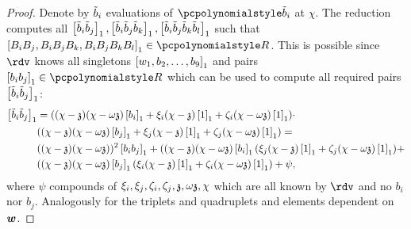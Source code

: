 \documentclass[runningheads,11pt]{llncs}
\let\spvec\vec
\let\vec\accentvec
\let\spvec\vec
\let\vec\spvec
\def\vec#1{\mathchoice{\mbox{\boldmath$\displaystyle#1$}}
  {\mbox{\boldmath$\textstyle#1$}} {\mbox{\boldmath$\scriptstyle#1$}}
  {\mbox{\boldmath$\scriptscriptstyle#1$}}}
\begin{document}
\begin{proof}
Denote by $\tilde{b}_i$ evaluations of $\p{\tb}_i$ at $\chi$.  The reduction computes
all
$\left[\tilde{b}_i \tilde{b}_j\right]_{1}, \left[\tilde{b}_i \tilde{b}_j \tilde{b}_k\right]_{1}, \left[\tilde{b}_i \tilde{b}_j \tilde{b}_k \tilde{b}_l\right]_{1}$
such that $\gone{B_i B_j, B_i B_j B_k, B_i B_j B_k B_l} \in \pR$.  This is
possible since $\rdv$ knows all singletons $\left[w_1, b_2, \ldots, b_9\right]_{1}$ and pairs
$\gone{b_i b_j} \in \pR$ which can be used to compute all required pairs
$\left[\tilde{b}_i \tilde{b}_j\right]_{1}$:
\begin{align*}
\left[\tilde{b}_i \tilde{b}_j\right]_{1} 
& = ((\chi - \mathfrak{z})(\chi - {\omega \mathfrak{z}})\left[b_i\right]_{1} + \xi_i (\chi - \mathfrak{z})\left[1\right]_{1} +
\zeta_i (\chi - {\omega \mathfrak{z}}) \left[1\right]_{1}) 
\cdot \\
 & ((\chi - \mathfrak{z})(\chi - {\omega \mathfrak{z}})\left[b_j\right]_{1} + \xi_j (\chi - \mathfrak{z})\left[1\right]_{1} +
\zeta_j (\chi - {\omega \mathfrak{z}}) \left[1\right]_{1}) = \\
 & ((\chi - \mathfrak{z})(\chi - {\omega \mathfrak{z}}))^2 \left[b_i b_j\right]_{1} +  ((\chi - \mathfrak{z})(\chi -
 {\omega \mathfrak{z}})\left[b_i\right]_{1} (\xi_j (\chi - \mathfrak{z}) \left[1\right]_{1} + \zeta_j (\chi - {\omega \mathfrak{z}})
 \left[1\right]_{1}) + \\
 & ((\chi - \mathfrak{z})(\chi -
 {\omega \mathfrak{z}})\left[b_j\right]_{1} (\xi_i (\chi - \mathfrak{z}) \left[1\right]_{1} + \zeta_i (\chi - {\omega \mathfrak{z}})
 \left[1\right]_{1}) + \psi,
\end{align*}
where $\psi$ compounds of $\xi_i, \xi_j, \zeta_i, \zeta_j, \mathfrak{z}, {\omega \mathfrak{z}}, \chi$ which
are all known by $\rdv$ and no $b_i$ nor $b_j$.
Analogously for the triplets and quadruplets and elements dependent on~$\vec{w}$. 


\end{proof}
\end{document}
